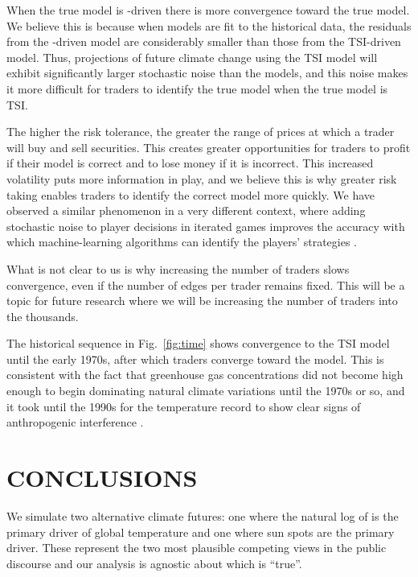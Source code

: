 \documentclass{wscpaperproc}\usepackage[]{graphicx}\usepackage[]{color}
\begin{document}
When the true model is -driven there is more convergence toward the true model. We believe this is because when models are fit to the historical data, the residuals from the -driven model are considerably smaller than those from the TSI-driven model. Thus, projections of future climate change using the TSI model will exhibit significantly larger stochastic noise than the  models, and this noise makes it more difficult for traders to identify the true model when the true model is TSI.

The higher the risk tolerance, the greater the range of prices at which a trader will buy and sell securities. This creates greater opportunities for traders to profit if their model is correct and to lose money if it is incorrect. This increased volatility puts more information in play, and we believe this is why greater risk taking enables traders to identify the correct model more quickly. We have observed a similar phenomenon in a very different context, where adding stochastic noise to player decisions in iterated games improves the accuracy with which machine-learning algorithms can identify the players' strategies .

What is not clear to us is why increasing the number of traders slows convergence, even if the number of edges per trader remains fixed. This will be a topic for future research where we will be increasing the number of traders into the thousands.

The historical sequence in Fig.~\ref{fig:time} shows convergence to the TSI model until the early 1970s, after which traders converge toward the  model. This is consistent with the fact that greenhouse gas concentrations did not become high enough to begin dominating natural climate variations until the 1970s or so, and it took until the 1990s for the temperature record to show clear signs of anthropogenic interference .

\section{CONCLUSIONS}

We simulate two alternative climate futures: one where the natural log of  is the primary driver of global temperature and one where sun spots are the primary driver. These represent the two most plausible competing views in the public discourse and our analysis is agnostic about which is ``true''.
\end{document}
